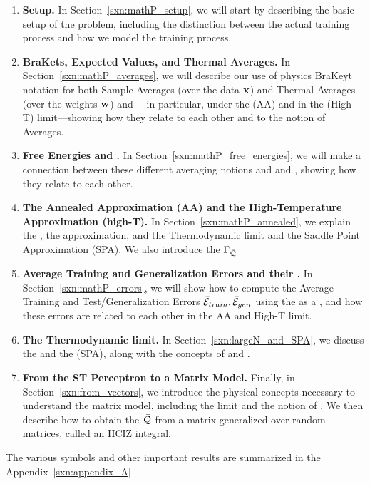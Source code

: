 \begin{enumerate}[label=4.2.\arabic*]
\item
  \textbf{Setup.}
  In Section~\ref{sxn:mathP_setup}, 
we will start by describing the basic setup of the problem, including the distinction between the actual training process and how we model the training process.

 \item
 \textbf{BraKets, Expected Values, and Thermal Averages.}
In Section~\ref{sxn:mathP_averages}, 
we will describe our use of physics BraKeyt notation for both Sample Averages (over the data ${\mathbf{x}}$) and Thermal Averages (over the weights ${\mathbf{w}}$) and ---in particular, under the \AnnealedApproximation (AA) and in the \HighTemperature (High-T) limit---showing how they relate to each other and to the notion of \Replica Averages.
%
\item
  \textbf{Free Energies and \GeneratingFunctions.} 
In Section~\ref{sxn:mathP_free_energies}, 
we will make a connection between these different averaging notions and \FreeEnergies and \GeneratingFunctions, showing how they relate to each other.
%

\item
  \textbf{The Annealed Approximation (AA) and the High-Temperature Approximation (high-T).}
  In Section~\ref{sxn:mathP_annealed}, we explain the \AnnealedApproximation, the \HighTemperature approximation,
  and the Thermodynamic \LargeN limit and the Saddle Point Approximation (SPA).
  We also introduce the \Quality \GeneratingFunction $\Gamma_{\bar{\mathcal{Q}}}$%
  \item
    \textbf{Average Training and Generalization Errors and their \GeneratingFunctions.}
  In Section~\ref{sxn:mathP_errors}, we will show how to compute the Average Training and Test/Generalization Errors $\bar{\mathcal{E}}_{train}, \bar{\mathcal{E}}_{gen}$
using the \FreeEnergy as a \GeneratingFunction, and how these errors are related to each other in the AA and High-T limit. 
%
\item 
  \textbf{The Thermodynamic limit.}
  In Section~\ref{sxn:largeN_and_SPA}, we discuss the \LargeN \ThermodynamicLimit and the \SaddlePointApproximation (SPA),
  along with the concepts of \SelfAveraging and \WickRotations.
%
\item 
  \textbf{From the ST Perceptron to a Matrix Model.} 
  Finally, in Section~\ref{sxn:from_vectors}, we introduce the physical concepts necessary to understand the \SETOL matrix model, including the \WideLayer \LargeN limit and the notion of \SizeConsistency.  We  then describe how to obtain the \LayerQuality $\bar{\mathcal{Q}}$ from a matrix-generalized \ThermalAverage over random matrices, called an HCIZ integral.
\end{enumerate}
The various symbols and other important results are summarized in the Appendix~\ref{sxn:appendix_A}



